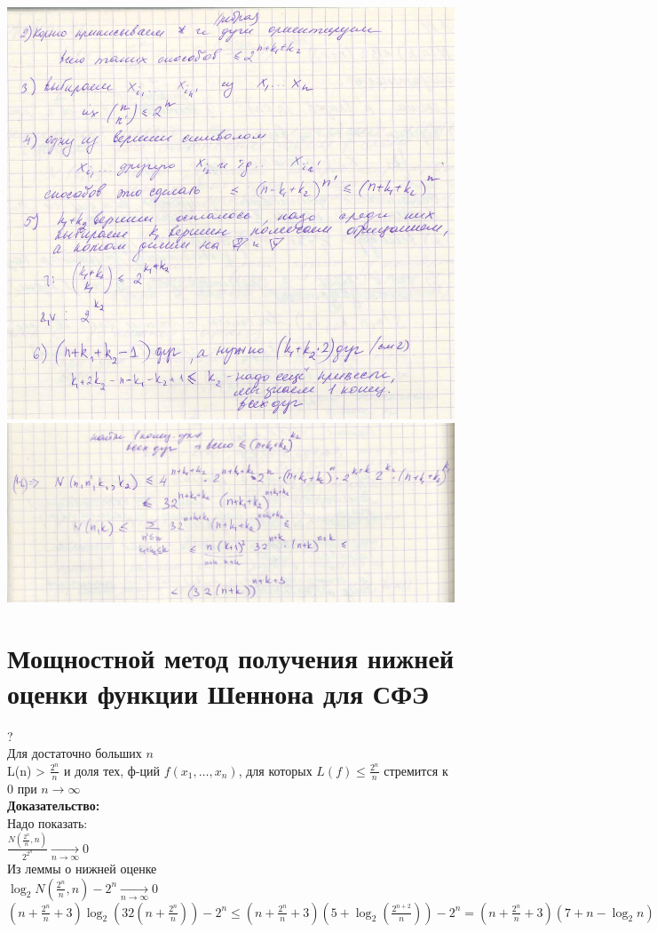 \documentclass[12pt]{article}
\begin{document}
		\includegraphics[width=400pt]{35}\\
		\includegraphics[width=500pt]{36}\\
	\qedsymbol

\section{Мощностной метод получения нижней оценки функции Шеннона для СФЭ}
?\\
	Для достаточно больших $n$\\
	L(n) > $\frac{2^n}{n}$ и доля тех, ф-ций $f(x_1,\dotsc,x_n)$, для которых $L(f) \leqslant \frac{2^n}{n}$ стремится к $0$ при $n \to \infty$\\
	\textbf{Доказательство:}\\
		Надо показать:\\
		$\frac{N(\frac{2^n}{n}, n)}{2^{2^n}} \underset{n \to \infty}{\to} 0$\\
		Из леммы о нижней оценке\\
		$\log_2 N(\frac{2^n}{n}, n) - 2^n \underset{n \to \infty}{\to} 0$\\
		$(n+\frac{2^n}{n}+3)\log_2(32(n+\frac{2^n}{n})) - 2^n \leqslant (n+\frac{2^n}{n}+3)(5 + \log_2(\frac{2^{n+2}}{n})) - 2^n = (n+\frac{2^n}{n}+3)(7 + n - \log_2n) - 2^n = 7n + n^2 - n\log_2n + 7 \cdot \frac{2^n}{n} + 2^n - \frac{2^n}{n} \log_2n + 21 + 3n - 3\log_2n - 2^n \underset{n \to \infty}{\to} -\infty$\\
	\qedsymbol
\end{document}
